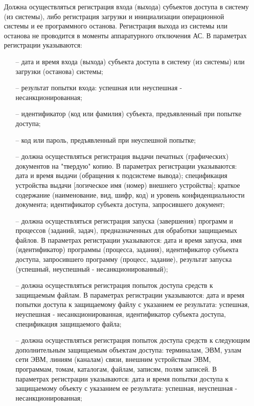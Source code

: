 Должна осуществляться регистрация входа (выхода) субъектов доступа в
систему (из системы), либо регистрация загрузки и инициализации
операционной системы и ее программного останова. Регистрация выхода из
системы или останова не проводится в моменты аппаратурного отключения
АС. В параметрах регистрации указываются:
\begin{itemize}
  \item[--] дата и время входа (выхода) субъекта доступа в систему (из системы) или
  загрузки (останова) системы;
  \item[--] результат попытки входа: успешная или неуспешная - несанкционированная;
  \item[--] идентификатор (код или фамилия) субъекта, предъявленный при попытке
  доступа;
  \item[--] код или пароль, предъявленный при неуспешной попытке;
  \item[--] должна осуществляться регистрация выдачи печатных (графических) 
  документов на "твердую" копию. В параметрах регистрации указываются:
  дата и время выдачи (обращения к подсистеме вывода);
  спецификация устройства выдачи [логическое имя (номер) внешнего устройства]; 
  краткое содержание (наименование, вид, шифр, код) и уровень конфиденциальности
  документа;
  идентификатор субъекта доступа, запросившего документ;
  \item[--] должна осуществляться регистрация запуска (завершения) программ и процессов
  (заданий, задач), предназначенных для обработки защищаемых файлов. В параметрах 
  регистрации указываются: дата и время запуска, имя (идентификатор) программы (процесса, задания),
  идентификатор субъекта доступа, запросившего программу (процесс, задание), результат запуска (успешный, неуспешный - несанкционированный);
  \item[--] должна осуществляться регистрация попыток доступа средств 
  к защищаемым файлам. В параметрах регистрации указываются: дата и время попытки 
  доступа к защищаемому файлу с указанием ее результата: успешная, неуспешная - несанкционированная,
  идентификатор субъекта доступа, спецификация защищаемого файла;
  \item[--] должна осуществляться регистрация попыток доступа средств к следующим 
  дополнительным защищаемым объектам доступа: терминалам, ЭВМ, узлам сети ЭВМ, линиям (каналам) связи, 
  внешним устройствам ЭВМ, программам, томам, каталогам, файлам, записям, полям записей. В параметрах регистрации указываются:
  дата и время попытки доступа к защищаемому объекту с указанием ее результата: успешная, неуспешная - несанкционированная;

\end{itemize}
